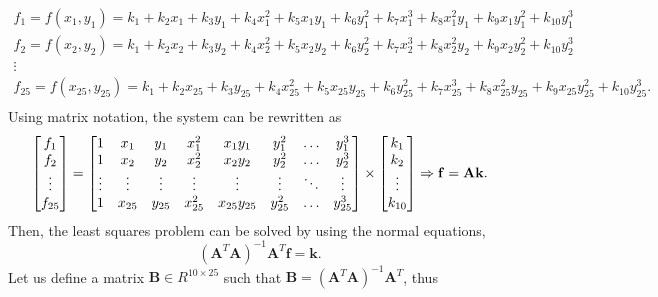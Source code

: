 \documentclass{ipol}
\numberwithin{equation}{section}
\numberwithin{table}{section}
\begin{document}
\begin{equation*}
	\begin{array}{l}
		f_1 = f(x_1,y_1) = k_1 + k_2x_1 + k_3y_1 + k_4x_1^2 + k_5x_1y_1 + k_6y_1^2 + k_7x_1^3 + k_8x_1^2y_1 + k_9x_1y_1^2 + k_{10}y_1^3 \\
		f_2 = f(x_2,y_2) = k_1 + k_2x_2 + k_3y_2 + k_4x_2^2 + k_5x_2y_2 + k_6y_2^2 + k_7x_2^3 + k_8x_2^2y_2 + k_9x_2y_2^2 + k_{10}y_2^3 \\
		\vdots \\
		f_{25} = f(x_{25},y_{25}) = k_1 + k_2x_{25} + k_3y_{25} + k_4x_{25}^2 + k_5x_{25}y_{25} + k_6y_{25}^2 + k_7x_{25}^3 + k_8x_{25}^2y_{25} + k_9x_{25}y_{25}^2 + k_{10}y_{25}^3 . \\
	\end{array}
\end{equation*}
%
Using matrix notation, the system can be rewritten as
%
\begin{equation*}
	\begin{bmatrix} 
		f_1		\\ 
		f_2		\\ 
		\vdots	\\
		f_{25}
	\end{bmatrix} 
	= 
	\begin{bmatrix} 
		1 		& x_1 		& y_1 		& x_1^2 	& x_1y_1 		& y_1^2 	& \hdots 	& y_1^3 	\\
		1 		& x_2 		& y_2 		& x_2^2 	& x_2y_2 		& y_2^2 	& \hdots 	& y_2^3 	\\
		\vdots	& \vdots	& \vdots	& \vdots	& \vdots		& \vdots	& \ddots	& \vdots	\\
		1 		& x_{25}	& y_{25}	& x_{25}^2 	& x_{25}y_{25} 	& y_{25}^2 	& \hdots 	& y_{25}^3
	\end{bmatrix}
	\times
	\begin{bmatrix}
		k_1		\\
		k_2		\\
		\vdots	\\
		k_{10}
	\end{bmatrix}
	\Rightarrow \mathbf{f} = \mathbf{A}\mathbf{k} .\\
\end{equation*}
%
Then, the least squares problem can be solved by using the normal equations,
%
\begin{equation*}
	(\mathbf{A}^T\mathbf{A})^{-1}\mathbf{A}^T\mathbf{f} = \mathbf{k}.
\end{equation*}
%
Let us define a matrix $\mathbf{B} \in R^{10\times25}$ such that $\mathbf{B}=(\mathbf{A}^T\mathbf{A})^{-1}\mathbf{A}^T$, thus
%
\end{document}
